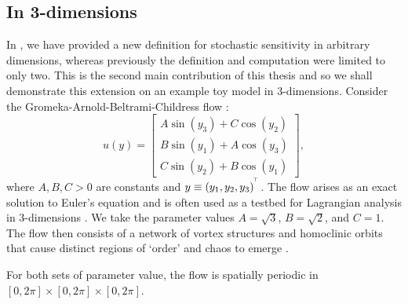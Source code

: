 \subsection{In 3-dimensions}\label{sec:comput_s2_3d}
In , we have provided a new definition for stochastic sensitivity in arbitrary dimensions, whereas previously the definition and computation \citep{Balasuriya_2020_StochasticSensitivityComputable} were limited to only two.
This is the second main contribution of this thesis and so we shall demonstrate this extension on an example toy model in 3-dimensions.
Consider the Gromeka-Arnold-Beltrami-Childress flow \citep{DombreEtAl_1986_ChaoticStreamlinesABC}:
\begin{equation}\label{eqn:gabc}
	u\!\left(y\right) = \begin{bmatrix}
		A\sin\!\left(y_3\right) + C\cos\!\left(y_2\right) \\
		B\sin\!\left(y_1\right) + A\cos\!\left(y_3\right) \\
		C\sin\!\left(y_2\right) + B\cos\!\left(y_1\right)
	\end{bmatrix},
\end{equation}
where \(A, B, C > 0\) are constants and \(y \equiv \left(y_1, y_2, y_3\right)^{^{\!\top}}\).
The flow arises as an exact solution to Euler's equation and is often used as a testbed for Lagrangian analysis in 3-dimensions \citep[e.g.]{NelsonJacobs_2016_HighorderVisualizationThreedimensional,BruntonRowley_2010_FastComputationFinitetime,Haller_2001_DistinguishedMaterialSurfaces,SulmanEtAl_2013_LeavingFlatlandDiagnostics}.
We take the parameter values \(A = \sqrt{3}\), \(B = \sqrt{2}\), and \(C = 1\).
The flow then consists of a network of vortex structures and homoclinic orbits that cause distinct regions of `order' and chaos to emerge \citep{DombreEtAl_1986_ChaoticStreamlinesABC}.

For both sets of parameter value, the flow is spatially periodic in \([0,2\pi] \times [0,2\pi] \times [0,2\pi]\).

